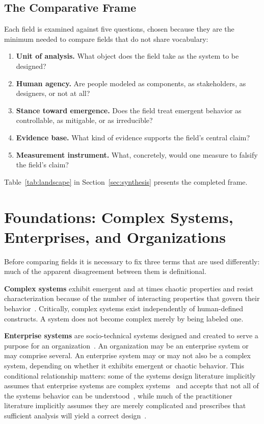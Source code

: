 \documentclass{csimq}
\begin{document}
\subsection{The Comparative Frame}

Each field is examined against five questions, chosen because they are the
minimum needed to compare fields that do not share vocabulary:

\begin{enumerate}
\item \textbf{Unit of analysis.} What object does the field take as the
system to be designed?
\item \textbf{Human agency.} Are people modeled as components, as stakeholders,
as designers, or not at all?
\item \textbf{Stance toward emergence.} Does the field treat emergent
behavior as controllable, as mitigable, or as irreducible?
\item \textbf{Evidence base.} What kind of evidence supports the field's
central claim?
\item \textbf{Measurement instrument.} What, concretely, would one measure to
falsify the field's claim?
\end{enumerate}

Table~\ref{tab:landscape} in Section~\ref{sec:synthesis} presents the completed
frame.

\section{Foundations: Complex Systems, Enterprises, and Organizations}
\label{sec:foundations}

Before comparing fields it is necessary to fix three terms that are used
differently: much of the apparent disagreement between them is
definitional.

\textbf{Complex systems} exhibit emergent and at times chaotic properties and
resist characterization because of the number of interacting properties that
govern their behavior~\cite{siddique2024}. Critically, complex systems exist
independently of human-defined constructs. A system does not become complex
merely by being labeled one.

\textbf{Enterprise systems} are socio-technical systems designed and created to
serve a purpose for an organization~\cite{xu2016}. An organization may be an
enterprise system or may comprise several. An enterprise system may or may not
also be a complex system, depending on whether it exhibits emergent or chaotic
behavior. This conditional relationship matters: some of the systems design
literature implicitly assumes that enterprise systems are complex
systems~\cite{holland1992,luoma2006} and accepts that not all of the systems behavior can be understood~\cite{kurtz2003}, while much of the practitioner literature
implicitly assumes they are merely complicated and prescribes that sufficient analysis will yield a correct
design~\cite{zachman_nd,lapalme2012,gong2019}.
\end{document}
